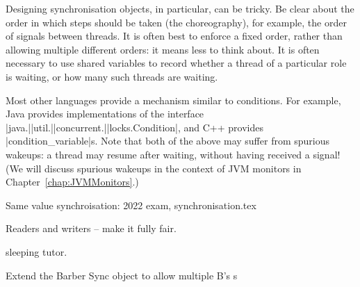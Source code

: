 Designing synchronisation objects, in particular, can be tricky.  Be clear
about the order in which steps should be taken (the choreography), for
example, the order of
signals between threads.  It is often best to enforce a fixed order, rather
than allowing multiple different orders: it means less to think about.  It is
often necessary to use shared variables to record whether a thread of a
particular role is waiting, or how many such threads are waiting.




Most other languages provide a mechanism similar to conditions.  For example,
Java provides implementations of the interface
|java.|\linebreak[1]|util.|\linebreak[1]|concurrent.|\linebreak[1]|locks.Condition|,
and C++ provides |condition_variable|s.
%
Note that both of the above may suffer from spurious wakeups: a thread may
resume after waiting, without having received a signal!  (We will discuss
spurious wakeups in the context of JVM monitors in
Chapter~\ref{chap:JVMMonitors}.) 





\exercises















Same value synchroisation: 2022 exam, synchronisation.tex

Readers and writers -- make it fully fair.

sleeping tutor.

Extend the Barber Sync object to allow multiple B's
s
